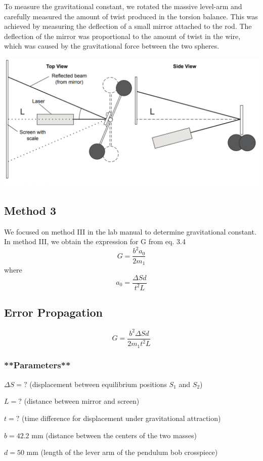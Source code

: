 \documentclass[a4paper]{tufte-handout}
\begin{document}
To measure the gravitational constant, we rotated the massive level-arm and carefully measured the amount of twist produced in the torsion balance. This was achieved by measuring the deflection of a small mirror attached to the rod. The deflection of the mirror was proportional to the amount of twist in the wire, which was caused by the gravitational force between the two spheres.

\includegraphics[width= 1 \linewidth]{figures/setup.png}

\subsection{Method 3}
We focused on method III in the lab manual to determine gravitational constant. 
In method III, we obtain the expression for G from eq. 3.4
$$G = \frac{b^2a_0}{2m_1}$$
where
$$a_0 = \frac{\Delta S d}{t^2 L}$$


\subsection{Error Propagation}
$$G = \frac{b^2 \Delta S d}{2 m_1 t^2 L}$$

\subsubsection{**Parameters**}

$\Delta S = ?$ (displacement between equilibrium positions $S_1$ and $S_2$)

$L = ?$ (distance between mirror and screen)

$t = ?$ (time difference for displacement under gravitational attraction)

$b =  42.2 $ mm (distance between the centers of the two masses)

$d = 50 $ mm (length of the lever arm of the pendulum bob crosspiece)
\end{document}
